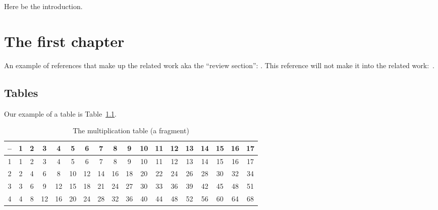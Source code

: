\documentclass[times, %
               specification,annotation, %
               titlepage-extra-ru,specification-extra-ru,annotation-extra-ru, %
               languages={russian,english} %
              ]{itmo-student-thesis}
\begin{document}


\tableofcontents

\startprefacepage

Here be the introduction.

\chapter{The first chapter}

\startrelatedwork
An example of references that make up the related work aka the ``review section'': \cite{example-english, example-russian, unrestricted-jump-evco, nsga-ii-steady-state}.
\finishrelatedwork
This reference will not make it into the related work:~\cite{bellman}.

\section{Tables}\label{sec:tables}

Our example of a table is Table~\ref{tab1}.

\begin{table}[!h]
\caption{The multiplication table (a fragment)}\label{tab1}
\centering
\begin{tabular}{|*{18}{c|}}\hline
-- & 1 & 2 & 3 & 4 & 5 & 6 & 7 & 8 & 9 & 10 & 11 & 12 & 13 & 14 & 15 & 16 & 17 \\\hline
1  & 1 & 2 & 3 & 4 & 5 & 6 & 7 & 8 & 9 & 10 & 11 & 12 & 13 & 14 & 15 & 16 & 17 \\\hline
2  & 2 & 4 & 6 & 8 & 10 & 12 & 14 & 16 & 18 & 20 & 22 & 24 & 26 & 28 & 30 & 32 & 34 \\\hline
3  & 3 & 6 & 9 & 12 & 15 & 18 & 21 & 24 & 27 & 30 & 33 & 36 & 39 & 42 & 45 & 48 & 51 \\\hline
4  & 4 & 8 & 12 & 16 & 20 & 24 & 28 & 32 & 36 & 40 & 44 & 48 & 52 & 56 & 60 & 64 & 68 \\\hline
\end{tabular}
\end{table}
\end{document}
